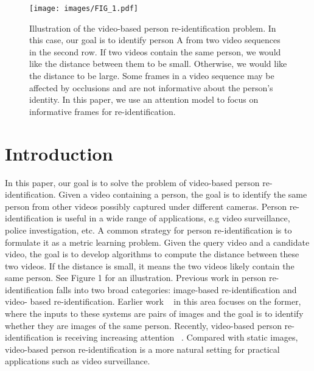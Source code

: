 \documentclass[sigconf, authordraft,review=false]{acmart}
\begin{document}


\maketitle

\begin{figure*}
\texttt{[image: images/FIG\_1.pdf]}
\caption{Illustration of the video-based person re-identification problem.  In this case, our goal is to identify person A from two video
sequences in the second row.  If two videos contain the same person, we would like the distance between them to be small.  Otherwise,
we would like the distance to be large. Some frames in a video sequence may be affected by occlusions and are not informative about the
person\textup{'}s identity. In this paper, we use an attention model to focus on informative frames for re-identification.}
\end{figure*}\section{Introduction}
In this paper, our goal is to solve the problem of video-based person re-identification.  Given a video containing a person, the goal is to identify the same person from other videos possibly captured under different cameras.  Person re-identification is useful in a wide range of applications,
e.g video surveillance, police investigation, etc. A common strategy for person re-identification is to formulate it as a metric learning problem.  Given the query video and a candidate video, the goal is to develop algorithms to compute the distance between these two videos.   If the distance is small, it means the two videos likely contain the same person. See Figure 1 for an illustration. Previous work in person re-identification falls into two broad categories: image-based re-identification and video-
based re-identification. Earlier work ~\cite{liao15_iccv,qian17_iccv,ustinova17_avss,varior16_eccv,
xiao16_cvpr,yi14_icpr,zhangL16_cvpr,zhengL15_iccv} in this area focuses on the former, where the inputs to these systems are pairs of images and the goal is  to  identify  whether  they  are  images  of  the  same  person.   Recently,  video-based  person  re-identification  is  receiving  increasing  attention ~\cite{li17_workshop,liu15_iccv,mclaughlin16_cvpr,wang14_eccv,
xu17_iccv,zhou17_cvpr,zhu16_ijcai}. Compared with static images, video-based person re-identification is a more natural setting for practical applications such as video surveillance. 
\end{document}
